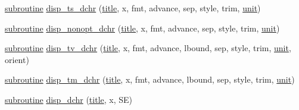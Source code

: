 \begin{DoxyCompactItemize}
\hyperlink{M__stopwatch_83_8txt_acfbcff50169d691ff02d4a123ed70482}{subroutine} \hyperlink{namespacem__display_a337ce942da78737d24272e0c0cf55fbb}{disp\+\_\+ts\+\_\+dchr} (\hyperlink{print__watch_83_8txt_a15b5bd21156bb9fca6a755ab8c029a9c}{title}, x, fmt, advance, sep, style, trim, \hyperlink{M__stopwatch_83_8txt_a5cbef30eb7c0d734bd82f5a7ebea9aa7}{unit})
\item 
\hyperlink{M__stopwatch_83_8txt_acfbcff50169d691ff02d4a123ed70482}{subroutine} \hyperlink{namespacem__display_a12b5831082d636bdab23dbc7c1ddb879}{disp\+\_\+nonopt\+\_\+dchr} (\hyperlink{print__watch_83_8txt_a15b5bd21156bb9fca6a755ab8c029a9c}{title}, x, fmt, advance, sep, style, trim, \hyperlink{M__stopwatch_83_8txt_a5cbef30eb7c0d734bd82f5a7ebea9aa7}{unit})
\item 
\hyperlink{M__stopwatch_83_8txt_acfbcff50169d691ff02d4a123ed70482}{subroutine} \hyperlink{namespacem__display_a72a748a2cf5f7d1fd96d5634a2daa11f}{disp\+\_\+tv\+\_\+dchr} (\hyperlink{print__watch_83_8txt_a15b5bd21156bb9fca6a755ab8c029a9c}{title}, x, fmt, advance, lbound, sep, style, trim, \hyperlink{M__stopwatch_83_8txt_a5cbef30eb7c0d734bd82f5a7ebea9aa7}{unit}, orient)
\item 
\hyperlink{M__stopwatch_83_8txt_acfbcff50169d691ff02d4a123ed70482}{subroutine} \hyperlink{namespacem__display_a617f15809ebffb2f8182db80523dd291}{disp\+\_\+tm\+\_\+dchr} (\hyperlink{print__watch_83_8txt_a15b5bd21156bb9fca6a755ab8c029a9c}{title}, x, fmt, advance, lbound, sep, style, trim, \hyperlink{M__stopwatch_83_8txt_a5cbef30eb7c0d734bd82f5a7ebea9aa7}{unit})
\item 
\hyperlink{M__stopwatch_83_8txt_acfbcff50169d691ff02d4a123ed70482}{subroutine} \hyperlink{namespacem__display_a41b95f416778be093db3be49b2334570}{disp\+\_\+dchr} (\hyperlink{print__watch_83_8txt_a15b5bd21156bb9fca6a755ab8c029a9c}{title}, x, SE)
\end{DoxyCompactItemize}
